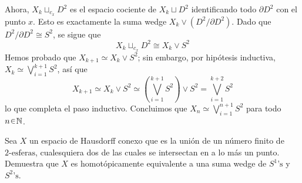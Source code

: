 \begin{sol}[Demostración]
\begin{itemize}
Ahora, $X_k \sqcup_{c_x} D^2$ es el espacio cociente de $X_k \sqcup D^2$ identificando todo $\partial D^2$ con el punto $x$. Esto es exactamente la suma wedge $X_k \vee (D^2 / \partial D^2)$. Dado que $D^2 / \partial D^2 \cong S^2$, se sigue que
\[
X_k \sqcup_{c_x} D^2 \cong X_k \vee S^2
\]
Hemos probado que $X_{k+1} \simeq X_k \vee S^2$; sin embargo, por hipótesis inductiva, $X_k \simeq \bigvee_{i=1}^{k+1} S^2$, así que
\[
X_{k+1} \simeq X_k \vee S^2 \simeq \left( \bigvee_{i=1}^{k+1} S^2 \right) \vee S^2 = \bigvee_{i=1}^{k+2} S^2
\]
lo que completa el paso inductivo. Concluimos que $X_n \simeq \bigvee_{i=1}^{n+1} S^2$ para todo $n \en \mathbb{N}$. \qedhere
\end{itemize}
\end{sol}

\setcounter{eje}{20}
\begin{ejer}
Sea $X$ un espacio de Hausdorff conexo que es la unión de un número finito de $2\text{-esferas}$, cualesquiera dos de las cuales se intersectan en a lo más un punto. Demuestra que $X$ es homotópicamente equivalente a una suma wedge de $S^1\text{’s}$ y $S^2\text{’s}$.
\end{ejer}
